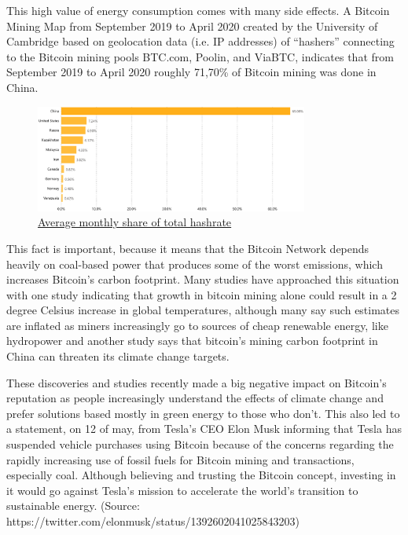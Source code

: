 \documentclass{article}
\begin{document}
This high value of energy consumption comes with many side effects. A  Bitcoin Mining Map from September 2019 to April 2020 created by the University of Cambridge based on geolocation data (i.e. IP addresses) of “hashers” connecting to the Bitcoin mining pools BTC.com, Poolin, and ViaBTC, indicates that from September 2019 to April 2020  roughly 71,70\% of Bitcoin mining was done in China.

\begin{figure}[H]
    \begin{center}
        \includegraphics[width=0.8\textwidth]{images/hashrate.png}
        \caption{\href{https://cbeci.org/mining_map}{\underline{Average monthly share of total hashrate}}}
    \end{center}
\end{figure}

This fact is important, because it means that the Bitcoin Network depends heavily on coal-based power that produces some of the worst emissions, which increases Bitcoin's carbon footprint. Many studies have approached  this situation with one study indicating that growth in bitcoin mining alone could result in a 2 degree Celsius increase in global temperatures, although many say such estimates are inflated as miners increasingly go to sources of cheap renewable energy, like hydropower and another study says that bitcoin’s mining carbon footprint in China can threaten its climate change targets.

These discoveries and studies recently made a big negative impact on Bitcoin's reputation as people increasingly understand the effects of climate change and prefer solutions based mostly in green energy to those who don’t. This also led to a statement, on 12 of may, from Tesla's CEO Elon Musk informing that Tesla has suspended vehicle purchases using Bitcoin because of the concerns regarding the rapidly increasing use of fossil fuels for Bitcoin mining and transactions, especially coal. Although believing and trusting the Bitcoin concept, investing in it would go against Tesla’s mission to accelerate the world’s transition to sustainable energy. (Source: https://twitter.com/elonmusk/status/1392602041025843203)
\end{document}
